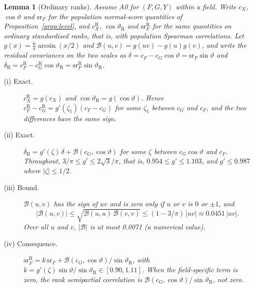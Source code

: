 \documentclass[11pt]{article}
\newtheorem{slemma}{Lemma}
\begin{document}
\begin{slemma}[Ordinary ranks]\label{lem:ranks}
Assume A0 for $(F,G,Y)$ within a field. Write $c_X$, $\cos\vartheta$ and $\mathrm{sr}_F$ for the population
normal-score quantities of Proposition~\ref{prop:level}, and $c^{\mathrm R}_X$, $\cos\vartheta_{\mathrm R}$ and
$\mathrm{sr}^{\mathrm R}_F$ for the same quantities on ordinary standardised ranks, that is, with population Spearman
correlations. Let $g(x)=\tfrac6\pi\arcsin(x/2)$ and $\mathcal B(u,v)=g(uv)-g(u)g(v)$, and write the residual covariances on
the two scales as $\delta=c_F-c_G\cos\vartheta=\mathrm{sr}_F\sin\vartheta$ and
$\delta_{\mathrm R}=c^{\mathrm R}_F-c^{\mathrm R}_G\cos\vartheta_{\mathrm R}=\mathrm{sr}^{\mathrm R}_F\sin\vartheta_{\mathrm R}$.
\begin{description}
\item[(i) Exact.] $c^{\mathrm R}_X=g(c_X)$ and $\cos\vartheta_{\mathrm R}=g(\cos\vartheta)$. Hence
$c^{\mathrm R}_F-c^{\mathrm R}_G=g'(\zeta_1)(c_F-c_G)$ for some $\zeta_1$ between $c_G$ and $c_F$, and the two
differences have the same sign.
\item[(ii) Exact.] $\delta_{\mathrm R}=g'(\zeta)\,\delta+\mathcal B(c_G,\cos\vartheta)$ for some $\zeta$ between
$c_G\cos\vartheta$ and $c_F$. Throughout, $3/\pi\le g'\le2\sqrt3/\pi$, that is, $0.954\le g'\le1.103$, and $g'\le0.987$
where $|\zeta|\le1/2$.
\item[(iii) Bound.] $\mathcal B(u,v)$ has the sign of $uv$ and is zero only if $u$ or $v$ is $0$ or $\pm1$, and
\[
|\mathcal B(u,v)|\le\sqrt{\mathcal B(u,u)\,\mathcal B(v,v)}\le(1-3/\pi)\,|uv|\approx0.0451\,|uv|.
\]
Over all $u$ and $v$, $|\mathcal B|$ is at most 0.0071 (a numerical value).
\item[(iv) Consequence.] $\mathrm{sr}^{\mathrm R}_F=k\,\mathrm{sr}_F+\mathcal B(c_G,\cos\vartheta)/\sin\vartheta_{\mathrm R}$, with
$k=g'(\zeta)\sin\vartheta/\sin\vartheta_{\mathrm R}\in[0.90,1.11]$. When the field-specific term is zero, the rank
semipartial correlation is $\mathcal B(c_G,\cos\vartheta)/\sin\vartheta_{\mathrm R}$, not zero.
\end{description}
\end{slemma}
\end{document}
